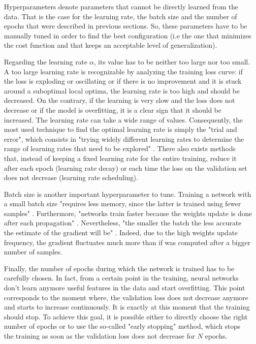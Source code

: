 \setlength{\marginparwidth}{3cm}\leavevmode {}Hyperparameters denote parameters that cannot be directly learned from the data. That is the case for the learning rate, the batch size and the number of epochs that were described in previous sections. So, these parameters have to be manually tuned in order to find the best configuration (i.e the one that minimizes the cost function and that keeps an acceptable level of generalization).

Regarding the learning rate $\alpha$, its value has to be neither too large nor too small. A too large learning rate is recognizable by analyzing the training loss curve: if the loss is exploding or oscillating or if there is no improvement and it is stuck around a suboptimal local optima, the learning rate is too high and should be decreased. On the contrary, if the learning is very slow and the loss does not decrease or if the model is overfitting, it is a clear sign that it should be increased. The learning rate can take a wide range of values. Consequently, the most used technique to find the optimal learning rate is simply the "trial and error", which consists in "trying widely different learning rates to determine the range of learning rates that need to be explored" \cite{28}. There also exists methods that, instead of keeping a fixed learning rate for the entire training, reduce it after each epoch (learning rate decay) or each time the loss on the validation set does not decrease (learning rate scheduling).

Batch size is another important hyperparameter to tune. Training a network with a small batch size "requires less memory, since the latter is trained using fewer samples" \cite{29}. Furthermore, "networks train faster because the weights update is done after each propagation" \cite{29}. Nevertheless, "the smaller the batch the less accurate the estimate of the gradient will be" \cite{29}. Indeed, due to the high weights update frequency, the gradient fluctuates much more than if was computed after a bigger number of samples.

Finally, the number of epochs during which the network is trained has to be carefully chosen. In fact, from a certain point in the training, neural networks don't learn anymore useful features in the data and start overfitting. This point corresponds to the moment where, the validation loss does not decrease anymore and starts to increase continuously. It is exactly at this moment that the training should stop. To achieve this goal, it is possible either to directly choose the right number of epochs or to use the so-called "early stopping" method, which stops the training as soon as the validation loss does not decrease for $N$ epochs.


